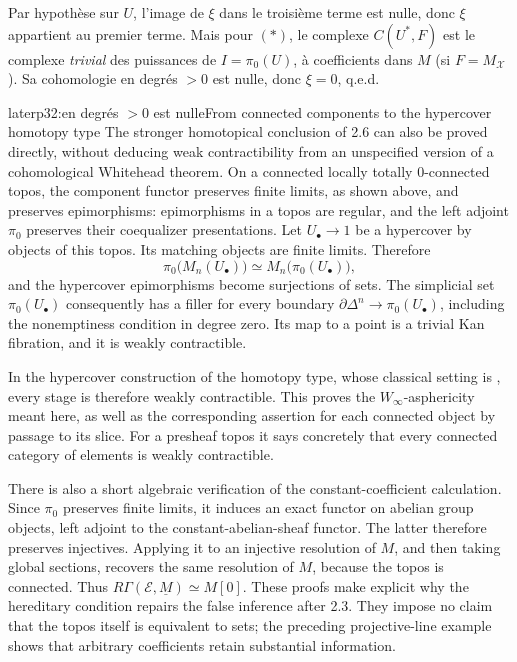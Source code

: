 
Par hypothèse sur $U$, l'image de $\xi$ dans le troisième terme est nulle, donc $\xi$ appartient au premier terme. Mais pour $(*)$, le complexe $C(U^*,F)$ est le complexe \textit{trivial} des puissances de $I=\pi_0(U)$, à coefficients dans $M$ (si $F=M_{\mathcal{X}}$). Sa cohomologie  en degrés $>0$ est nulle, donc $\xi=0$, q.e.d.

\begin{dcomment}{later}{p32:en degrés $>0$ est nulle}{From connected components to the hypercover homotopy type}
The stronger homotopical conclusion of 2.6 can also be proved directly, without deducing weak contractibility from an unspecified version of a cohomological Whitehead theorem. On a connected locally totally $0$-connected topos, the component functor preserves finite limits, as shown above, and preserves epimorphisms: epimorphisms in a topos are regular, and the left adjoint $\pi _0$ preserves their coequalizer presentations. Let $U_\bullet\to1$ be a hypercover by objects of this topos. Its matching objects are finite limits. Therefore
\[
 \pi _0\bigl(M_n(U_\bullet)\bigr)
       \simeq M_n\bigl(\pi _0(U_\bullet)\bigr),
\]
and the hypercover epimorphisms become surjections of sets. The simplicial set $\pi _0(U_\bullet)$ consequently has a filler for every boundary $\partial\Delta^n\to\pi _0(U_\bullet)$, including the nonemptiness condition in degree zero. Its map to a point is a trivial Kan fibration, and it is weakly contractible.

In the hypercover construction of the homotopy type, whose classical setting is \citet[\S\S8--9]{ArtinMazur1969}, every stage is therefore weakly contractible. This proves the $W_\infty$-asphericity meant here, as well as the corresponding assertion for each connected object by passage to its slice. For a presheaf topos it says concretely that every connected category of elements is weakly contractible.

There is also a short algebraic verification of the constant-coefficient calculation. Since $\pi _0$ preserves finite limits, it induces an exact functor on abelian group objects, left adjoint to the constant-abelian-sheaf functor. The latter therefore preserves injectives. Applying it to an injective resolution of $M$, and then taking global sections, recovers the same resolution of $M$, because the topos is connected. Thus $R\Gamma(\mathcal E,\underline M)\simeq M[0]$. These proofs make explicit why the hereditary condition repairs the false inference after 2.3. They impose no claim that the topos itself is equivalent to sets; the preceding projective-line example shows that arbitrary coefficients retain substantial information.
\end{dcomment}


